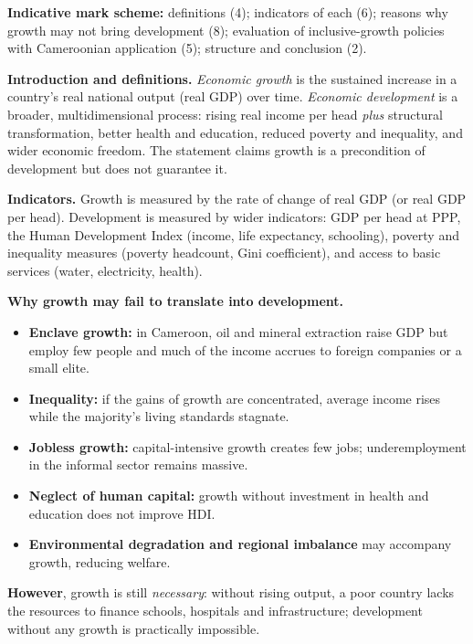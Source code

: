 \documentclass[11pt]{article}
\begin{document}
\begin{corrige}
\textbf{Indicative mark scheme:} definitions (4); indicators of each (6); reasons why growth may not bring development (8); evaluation of inclusive-growth policies with Cameroonian application (5); structure and conclusion (2).

\textbf{Introduction and definitions.} \emph{Economic growth} is the sustained increase in a country's real national output (real GDP) over time. \emph{Economic development} is a broader, multidimensional process: rising real income per head \emph{plus} structural transformation, better health and education, reduced poverty and inequality, and wider economic freedom. The statement claims growth is a precondition of development but does not guarantee it.

\textbf{Indicators.} Growth is measured by the rate of change of real GDP (or real GDP per head). Development is measured by wider indicators: GDP per head at PPP, the Human Development Index (income, life expectancy, schooling), poverty and inequality measures (poverty headcount, Gini coefficient), and access to basic services (water, electricity, health).

\textbf{Why growth may fail to translate into development.}
\begin{itemize}
\item \textbf{Enclave growth:} in Cameroon, oil and mineral extraction raise GDP but employ few people and much of the income accrues to foreign companies or a small elite.
\item \textbf{Inequality:} if the gains of growth are concentrated, average income rises while the majority's living standards stagnate.
\item \textbf{Jobless growth:} capital-intensive growth creates few jobs; underemployment in the informal sector remains massive.
\item \textbf{Neglect of human capital:} growth without investment in health and education does not improve HDI.
\item \textbf{Environmental degradation and regional imbalance} may accompany growth, reducing welfare.
\end{itemize}

\textbf{However}, growth is still \emph{necessary}: without rising output, a poor country lacks the resources to finance schools, hospitals and infrastructure; development without any growth is practically impossible.


\end{corrige}
\end{document}
